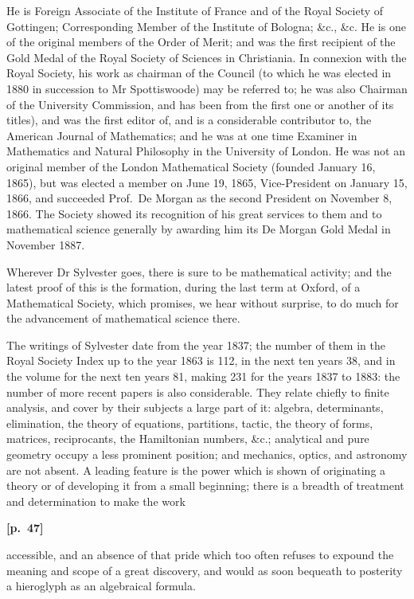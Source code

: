 \documentclass[11pt,a4paper]{article}
\theoremstyle{plain}
\begin{document}
He is Foreign Associate of the Institute of France and of the Royal Society of Gottingen; Corresponding Member of the Institute of Bologna; \&c., \&c. He is one of the original members of the Order of Merit; and was the first recipient of the Gold Medal of the Royal Society of Sciences in Christiania. In connexion with the Royal Society, his work as chairman of the Council (to which he was elected in 1880 in succession to Mr Spottiswoode) may be referred to; he was also Chairman of the University Commission, and has been from the first one or another of its titles), and was the first editor of, and is a considerable contributor to, the American Journal of Mathematics; and he was at one time Examiner in Mathematics and Natural Philosophy in the University of London. He was not an original member of the London Mathematical Society (founded January 16, 1865), but was elected a member on June 19, 1865, Vice-President on January 15, 1866, and succeeded Prof.\ De Morgan as the second President on November 8, 1866. The Society showed its recognition of his great services to them and to mathematical science generally by awarding him its De Morgan Gold Medal in November 1887.

Wherever Dr Sylvester goes, there is sure to be mathematical activity; and the latest proof of this is the formation, during the last term at Oxford, of a Mathematical Society, which promises, we hear without surprise, to do much for the advancement of mathematical science there.

The writings of Sylvester date from the year 1837; the number of them in the Royal Society Index up to the year 1863 is 112, in the next ten years 38, and in the volume for the next ten years 81, making 231 for the years 1837 to 1883: the number of more recent papers is also considerable. They relate chiefly to finite analysis, and cover by their subjects a large part of it: algebra, determinants, elimination, the theory of equations, partitions, tactic, the theory of forms, matrices, reciprocants, the Hamiltonian numbers, \&c.; analytical and pure geometry occupy a less prominent position; and mechanics, optics, and astronomy are not absent. A leading feature is the power which is shown of originating a theory or of developing it from a small beginning; there is a breadth of treatment and determination to make the work

\vspace{0.5em}
\noindent\textbf{[p.\ 47]}

accessible, and an absence of that pride which too often refuses to expound the meaning and scope of a great discovery, and would as soon bequeath to posterity a hieroglyph as an algebraical formula.
\end{document}
